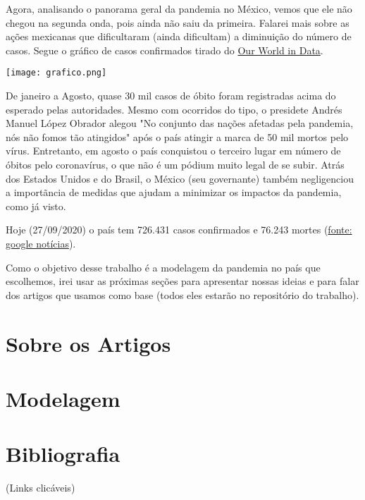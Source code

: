 \documentclass{article}
\begin{document}
Agora, analisando o panorama geral da pandemia no México, vemos que ele não chegou na segunda onda, pois ainda não saiu da primeira. Falarei mais sobre as ações mexicanas que dificultaram (ainda dificultam) a diminuição do número de casos. Segue o gráfico de casos confirmados tirado do \href{https://ourworldindata.org/coronavirus}{Our World in Data}. 

\texttt{[image: grafico.png]}

De janeiro a Agosto, quase 30 mil casos de óbito foram registradas acima do esperado pelas autoridades. Mesmo com ocorridos do tipo, o presidete Andrés Manuel López Obrador alegou "No conjunto das nações afetadas pela pandemia, nós não fomos tão atingidos" após o país atingir a marca de 50 mil mortos pelo vírus. Entretanto, em agosto o país conquistou o terceiro lugar em número de óbitos pelo coronavírus, o que não é um pódium muito legal de se subir. Atrás dos Estados Unidos e do Brasil, o México (seu governante) também negligenciou a importãncia de medidas que ajudam a minimizar os impactos da pandemia, como já visto. 

Hoje (27/09/2020) o país tem 726.431 casos confirmados e 76.243 mortes (\href{https://news.google.com/covid19/map?hl=pt-PT&mid=\%2Fm\%2F0b90_r&gl=PT&ceid=PT\%3Apt-150}{fonte: google notícias}).

Como o objetivo desse trabalho é a modelagem da pandemia no país que escolhemos, irei usar as próximas seções para apresentar nossas ideias e para falar dos artigos que usamos como base (todos eles estarão no repositório do trabalho).

\section{Sobre os Artigos}

\section{Modelagem}

\section{Bibliografia}
(Links clicáveis)
\end{document}
